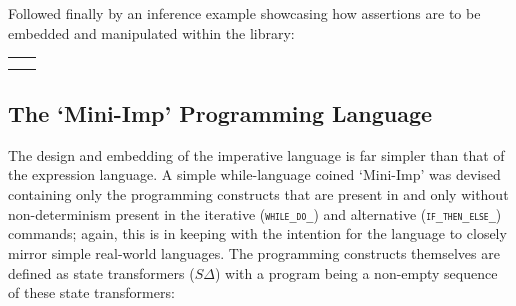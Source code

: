 \documentclass[oneside,12pt]{article}
\newcommand{\impcode}[1]{\textsc{\texttt{#1}}}
\newcommand{\stateT}{\ensuremath{S\Delta}}
\begin{document}
{\advance\leftskip\mathindent
  \advance\leftskip\mathindent

  

  \vspace{-1.5em}
}

 Followed finally by an inference example showcasing how assertions are to be embedded and manipulated within the library:


{\centering
  
  \begin{tabular}{cc}
    \centering
    \begin{minipage}[t]{0.45\textwidth}
      \centering
      
    \end{minipage}

    &
   
      \begin{minipage}[t]{0.45\textwidth}
        \centering
        
      \end{minipage}
       
    \\
    
    \multicolumn{2}{c}{
    \begin{minipage}{0.9\textwidth}
      \centering
      \vspace{-0.5cm}
      
    \end{minipage}}
 
  \end{tabular}
}


\subsection{The `Mini-Imp' Programming Language}

The design and embedding of the imperative language is far simpler than that of the expression language. A simple while-language coined `Mini-Imp' was devised containing only the programming constructs that are present in \cite{hoare1969axiomatic} and \cite{Dijkstra76} only without non-determinism present in the iterative (\impcode{while\_do\_}) and alternative (\impcode{if\_then\_else\_}) commands; again, this is in keeping with the intention for the language to closely mirror simple real-world languages. The programming constructs themselves are defined as state transformers (\stateT) with a program being a non-empty sequence of these state transformers:
\end{document}

